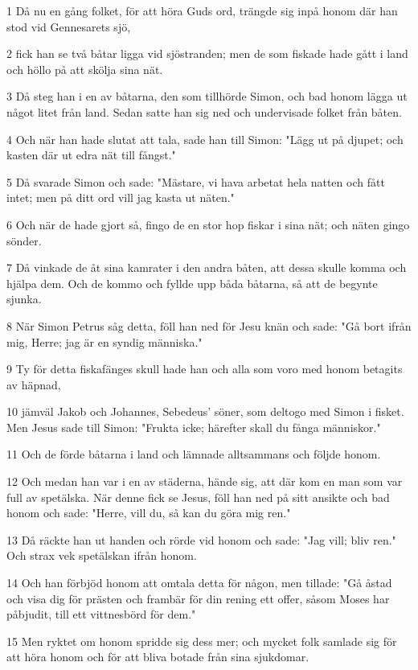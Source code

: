 \par 1 Då nu en gång folket, för att höra Guds ord, trängde sig inpå honom där han stod vid Gennesarets sjö,
\par 2 fick han se två båtar ligga vid sjöstranden; men de som fiskade hade gått i land och höllo på att skölja sina nät.
\par 3 Då steg han i en av båtarna, den som tillhörde Simon, och bad honom lägga ut något litet från land. Sedan satte han sig ned och undervisade folket från båten.
\par 4 Och när han hade slutat att tala, sade han till Simon: "Lägg ut på djupet; och kasten där ut edra nät till fångst."
\par 5 Då svarade Simon och sade: "Mästare, vi hava arbetat hela natten och fått intet; men på ditt ord vill jag kasta ut näten."
\par 6 Och när de hade gjort så, fingo de en stor hop fiskar i sina nät; och näten gingo sönder.
\par 7 Då vinkade de åt sina kamrater i den andra båten, att dessa skulle komma och hjälpa dem. Och de kommo och fyllde upp båda båtarna, så att de begynte sjunka.
\par 8 När Simon Petrus såg detta, föll han ned för Jesu knän och sade: "Gå bort ifrån mig, Herre; jag är en syndig människa."
\par 9 Ty för detta fiskafänges skull hade han och alla som voro med honom betagits av häpnad,
\par 10 jämväl Jakob och Johannes, Sebedeus' söner, som deltogo med Simon i fisket. Men Jesus sade till Simon: "Frukta icke; härefter skall du fånga människor."
\par 11 Och de förde båtarna i land och lämnade alltsammans och följde honom.
\par 12 Och medan han var i en av städerna, hände sig, att där kom en man som var full av spetälska. När denne fick se Jesus, föll han ned på sitt ansikte och bad honom och sade: "Herre, vill du, så kan du göra mig ren."
\par 13 Då räckte han ut handen och rörde vid honom och sade: "Jag vill; bliv ren." Och strax vek spetälskan ifrån honom.
\par 14 Och han förbjöd honom att omtala detta för någon, men tillade: "Gå åstad och visa dig för prästen och frambär för din rening ett offer, såsom Moses har påbjudit, till ett vittnesbörd för dem."
\par 15 Men ryktet om honom spridde sig dess mer; och mycket folk samlade sig för att höra honom och för att bliva botade från sina sjukdomar.
